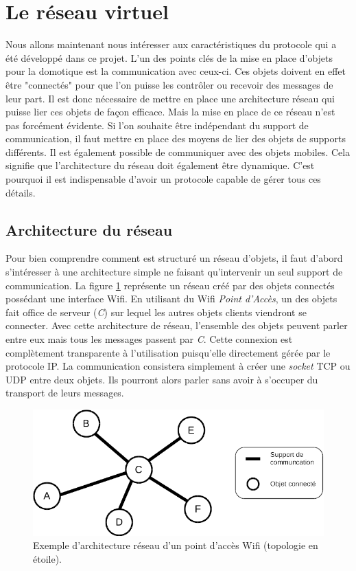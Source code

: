 \section{Le réseau virtuel}
	Nous allons maintenant nous intéresser aux caractéristiques du protocole qui a été
	développé dans ce projet. L'un des points clés de la mise en place d'objets pour la domotique 
	est la communication avec ceux-ci. Ces objets doivent en effet être "connectés" pour que l'on
	puisse les contrôler ou recevoir des messages de leur part. Il est donc nécessaire de mettre en 
	place une architecture réseau qui puisse lier ces objets de façon efficace. Mais la mise en place
	de ce réseau n'est pas forcément évidente. Si l'on souhaite être indépendant du support de 
	communication, il faut mettre en place des moyens de lier des objets de supports différents. Il 
	est également possible de communiquer avec des objets mobiles. Cela signifie que l'architecture 
	du réseau doit également être dynamique. C'est pourquoi il est indispensable d'avoir un protocole
	capable de gérer tous ces détails.
	
	\subsection{Architecture du réseau}
		Pour bien comprendre comment est structuré un réseau d'objets, il faut d'abord s'intéresser 
		à une architecture simple ne faisant qu'intervenir un seul support de communication. La figure
		\ref{netStar} représente un réseau créé par des objets connectés possédant une interface Wifi.
		En utilisant du Wifi \emph{Point d'Accès}, un des objets fait office de serveur (\emph{C}) 
		sur lequel les autres objets clients viendront se connecter. Avec cette architecture de 
		réseau, l'ensemble des objets peuvent parler entre eux mais tous les messages passent par 
		\emph{C}. Cette connexion est complètement transparente à l'utilisation puisqu'elle 
		directement gérée par le protocole IP. La communication consistera simplement à créer une
		\emph{socket} TCP ou UDP entre deux objets. Ils pourront alors parler sans avoir à s'occuper
		du transport de leurs messages.
		
		\begin{figure}[!ht]
         \centering
         \includegraphics[width=.8\textwidth]{img/reseau_etoile.png}
         \caption{Exemple d'architecture réseau d'un point d'accès Wifi (topologie en étoile).}
         \label{netStar}
      \end{figure}

